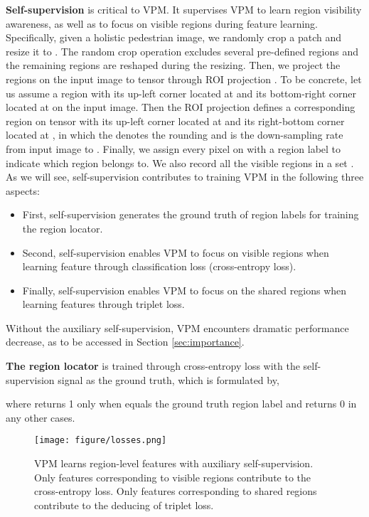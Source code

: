 \documentclass[10pt,twocolumn,letterpaper]{article}
\begin{document}
\textbf{Self-supervision} is critical to VPM. It supervises VPM to learn region visibility awareness, as well as to focus on visible regions during feature learning. Specifically, given a holistic pedestrian image, we randomly crop a patch and resize it to . The random crop operation excludes several pre-defined regions and the remaining regions are reshaped during the resizing. Then, we project the regions on the input image to tensor  through ROI projection \cite{kaiming14ECCV, Ren2015Faster}. To be concrete, let us assume a region with its up-left corner located at  and its bottom-right corner located at  on the input image. Then the ROI projection defines a corresponding region on tensor  with its up-left corner located at  and its right-bottom corner located at , in which the  denotes the rounding and  is the down-sampling rate from input image to . Finally, we assign every pixel  on  with a region label  to indicate which region  belongs to. We also record all the visible regions in a set . As we will see, self-supervision contributes to training VPM in the following three aspects:

\begin{itemize}
\item First, self-supervision generates the ground truth of region labels for training the region locator.
\item Second, self-supervision enables VPM to focus on visible regions when learning feature through classification loss (cross-entropy loss). 
\item Finally, self-supervision enables VPM to focus on the shared regions when learning features through triplet loss.
\end{itemize}

Without the auxiliary self-supervision, VPM encounters dramatic performance decrease, as to be accessed in Section \ref{sec:importance}.


 \textbf{The region locator} is trained through cross-entropy loss with the self-supervision signal  as the ground truth, which is formulated by,

where  returns 1 only when  equals the ground truth region label  and returns 0 in any other cases. 


\begin{figure}[t]
\setlength{\abovecaptionskip}{-1.2cm} 
\setlength{\belowcaptionskip}{-0.4cm}
\begin{center}
\texttt{[image: figure/losses.png]}
\end{center}
   \caption{VPM learns region-level features with auxiliary self-supervision. Only features corresponding to visible regions contribute to the cross-entropy loss. Only features corresponding to shared regions contribute to the deducing of triplet loss.}
\label{fig:loss}
\end{figure}
\end{document}
